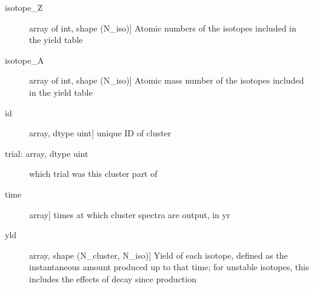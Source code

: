 \documentclass[letterpaper,10pt,english]{sphinxmanual}
\begin{document}
\begin{fulllineitems}
\begin{description}
\begin{description}
\item[{isotope\_Z}] \leavevmode{[}array of int, shape (N\_iso){]}
Atomic numbers of the isotopes included in the yield table

\item[{isotope\_A}] \leavevmode{[}array of int, shape (N\_iso){]}
Atomic mass number of the isotopes included in the yield table

\item[{id}] \leavevmode{[}array, dtype uint{]}
unique ID of cluster

\item[{trial: array, dtype uint}] \leavevmode
which trial was this cluster part of

\item[{time}] \leavevmode{[}array{]}
times at which cluster spectra are output, in yr

\item[{yld}] \leavevmode{[}array, shape (N\_cluster, N\_iso){]}
Yield of each isotope, defined as the instantaneous amount
produced up to that time; for unstable isotopes, this
includes the effects of decay since production

\end{description}

\end{description}

\end{fulllineitems}

\end{document}
